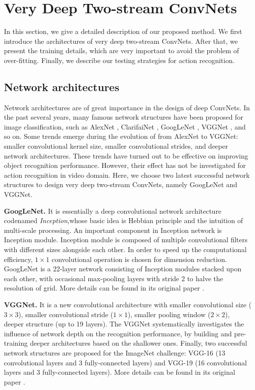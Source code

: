 \documentclass[10pt,twocolumn,letterpaper]{article}
\begin{document}
\section{Very Deep Two-stream ConvNets}
\label{sec:method}

In this section, we give a detailed description of our proposed method. We first introduce the architectures of very deep two-stream ConvNets. After that, we present the training details, which are very important to avoid the problem of over-fitting. Finally, we describe our testing strategies for action recognition.

\subsection{Network architectures}
Network architectures are of great importance in the design of deep ConvNets. In the past several years, many famous network structures have been proposed for image classification, such as AlexNet \cite{KrizhevskySH12}, ClarifaiNet \cite{ZeilerF14}, GoogLeNet \cite{SzegedyLJSRAEVR14}, VGGNet \cite{SimonyanZ14a}, and so on. Some trends emerge during the evolution of from AlexNet to VGGNet: smaller convolutional kernel size, smaller convolutional strides, and deeper network architectures. These trends have turned out to be effective on improving object recognition performance. However, their effect has not be investigated for action recognition in video domain. Here, we choose two latest successful network structures to design very deep two-stream ConvNets, namely GoogLeNet and VGGNet.

\textbf{GoogLeNet.} It is essentially a deep convolutional network architecture codenamed \emph{Inception},whose basic idea is  Hebbian principle and the intuition of multi-scale processing. An important component in Inception network is Inception module. Inception module is composed of multiple convolutional filters with different sizes alongside each other. In order to speed up the computational efficiency, $1 \times 1$ convolutional operation is chosen for dimension reduction. GoogLeNet is a 22-layer network consisting of Inception modules stacked upon each other, with occasional max-pooling layers with stride 2 to halve the resolution of grid. More details can be found in its original paper \cite{SzegedyLJSRAEVR14}.

\textbf{VGGNet.} It is a new convolutional architecture with smaller convolutional size ($3 \times 3$), smaller convolutional stride ($1 \times 1$), smaller pooling window ($2 \times 2$), deeper structure (up to 19 layers). The VGGNet systematically investigates the influence of network depth on the recognition performance, by building and pre-training deeper architectures based on the shallower ones. Finally, two successful network structures are proposed for the ImageNet challenge: VGG-16 (13 convolutional layers and 3 fully-connected layers) and VGG-19 (16 convolutional layers and 3 fully-connected layers). More details can be found in its original paper \cite{SimonyanZ14a}.
\end{document}
